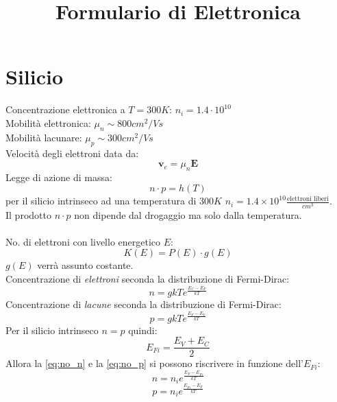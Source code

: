 \documentclass{article}
\title{Formulario di Elettronica}
\author{}
\date{}
\def \*#1{\mathbf{#1}}
\begin{document}
\maketitle

\section*{Silicio}
Concentrazione elettronica a $T=300K$: $n_i=1.4 \cdot 10^{10}$\\
Mobilità elettronica: $\mu_n \sim 800 cm^2/Vs$\\
Mobilità lacunare: $\mu_p \sim 300 cm^2/Vs$\\
Velocità degli elettroni data da:
\begin{equation*}
\*v_e = \mu_n\*E
\end{equation*}
Legge di azione di massa:
\begin{equation*}
n \cdot p = h(T)
\end{equation*}
per il silicio intrinseco ad una temperatura di $300K$ $n_i = 1.4 \times 10^{10} \frac{\text{elettroni liberi}}{cm^3}$.\\
Il prodotto $n\cdot p$ non dipende dal drogaggio ma solo dalla temperatura.\\
\\
No. di elettroni con livello energetico $E$:
\begin{equation*}
K(E)=P(E) \cdot g(E)
\end{equation*}
$g(E)$ verrà assunto costante.\\
Concentrazione di \textit{elettroni} seconda la distribuzione di Fermi-Dirac:
\begin{equation} \label{eq:no_n}
n = gkTe^\frac{E_C-E_F}{kT}
\end{equation}
Concentrazione di \textit{lacune} seconda la distribuzione di Fermi-Dirac:
\begin{equation} \label{eq:no_p}
p = gkT e^\frac{E_F-E_V}{kT}
\end{equation}
Per il silicio intrinseco $n=p$ quindi:
\begin{equation*}
E_{Fi} = \frac{E_V + E_C}{2}
\end{equation*}
Allora la \eqref{eq:no_n} e la \eqref{eq:no_p} si possono riscrivere in funzione dell'$E_{Fi}$:
\begin{equation*}
n = n_i e^\frac{E_F-E_{Fi}}{kT}
\end{equation*}
\begin{equation*}
p = n_i e^\frac{E_{Fi}-E_F}{kT}
\end{equation*}
\end{document}
